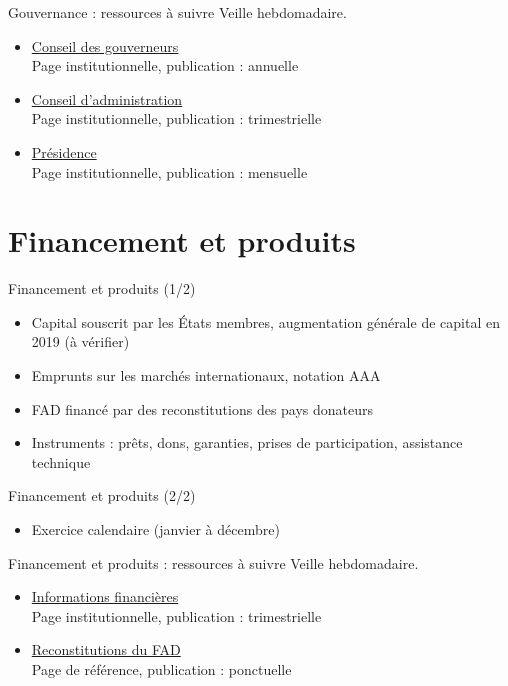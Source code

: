 \documentclass[aspectratio=169,11pt]{beamer}
\begin{document}
\begin{frame}{Gouvernance : ressources à suivre}
\small
Veille hebdomadaire.
\begin{itemize}
\item \href{https://www.afdb.org/en/about-us/organizational-structure/board-of-governors}{Conseil des gouverneurs}\\{\footnotesize Page institutionnelle, publication : annuelle}
\item \href{https://www.afdb.org/en/about-us/organizational-structure/board-of-directors}{Conseil d'administration}\\{\footnotesize Page institutionnelle, publication : trimestrielle}
\item \href{https://www.afdb.org/en/about-us/organizational-structure/president}{Présidence}\\{\footnotesize Page institutionnelle, publication : mensuelle}
\end{itemize}
\end{frame}

\section{Financement et produits}
\begin{frame}{Financement et produits (1/2)}
\begin{itemize}
\item Capital souscrit par les États membres, augmentation générale de capital en 2019 (à vérifier)
\item Emprunts sur les marchés internationaux, notation AAA
\item FAD financé par des reconstitutions des pays donateurs
\item Instruments : prêts, dons, garanties, prises de participation, assistance technique
\end{itemize}
\end{frame}

\begin{frame}{Financement et produits (2/2)}
\begin{itemize}
\item Exercice calendaire (janvier à décembre)
\end{itemize}
\end{frame}

\begin{frame}{Financement et produits : ressources à suivre}
\small
Veille hebdomadaire.
\begin{itemize}
\item \href{https://www.afdb.org/en/about-us/corporate-information/financial-information}{Informations financières}\\{\footnotesize Page institutionnelle, publication : trimestrielle}
\item \href{https://www.afdb.org/en/about-us/african-development-fund/adf-replenishments}{Reconstitutions du FAD}\\{\footnotesize Page de référence, publication : ponctuelle}
\end{itemize}
\end{frame}
\end{document}
